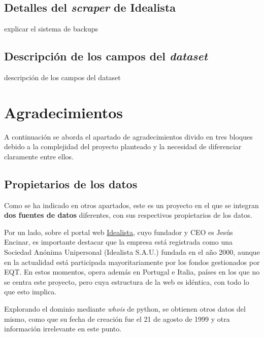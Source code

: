 \documentclass[12pt]{article}
\begin{document}
\vspace{-1.5em}\subsection*{Detalles del \textit{scraper} de Idealista}\vspace{-1em}

explicar el sistema de backups

\vspace{-1.5em}\subsection*{Descripción de los campos del \textit{dataset}}\vspace{-1em}

descripción de los campos del dataset

\newpage
\vspace{-1.5em}\section{Agradecimientos}\vspace{-1.0em}

A continuación se aborda el apartado de agradecimientos divido en tres bloques debido a la complejidad del proyecto planteado y la necesidad de diferenciar claramente entre ellos. 

\vspace{-1.5em}\subsection*{Propietarios de los datos}\vspace{-1.0em}

Como se ha indicado en otros apartados, este es un proyecto en el que se integran \textbf{dos fuentes de datos} diferentes, con sus respectivos propietarios de los datos. 

Por un lado, sobre el portal web \href{http://www.idealista.com}{Idealista}, cuyo fundador y CEO es Jesús Encinar, es importante destacar que la empresa está registrada como una Sociedad Anónima Unipersonal (Idealista S.A.U.) fundada en el año 2000, aunque en la actualidad está participada mayoritariamente por los fondos gestionados por EQT. En estos momentos, opera además en Portugal e Italia, países en los que no se centra este proyecto, pero cuya estructura de la web es idéntica, con todo lo que esto implica. 

Explorando el dominio mediante \textit{whois} de python, se obtienen otros datos del mismo, como que su fecha de creación fue el 21 de agosto de 1999 y otra información irrelevante en este punto.
\end{document}
